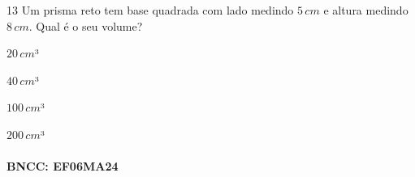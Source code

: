 
\num{13} Um prisma reto tem base quadrada com lado medindo $5\,cm$ e altura
medindo $8\,cm$. Qual é o seu volume?

\begin{escolha}
\item $20\,cm$³
\item $40\,cm$³
\item $100\,cm$³
\item $200\,cm$³
\end{escolha}

\paragraph{BNCC: EF06MA24 }


